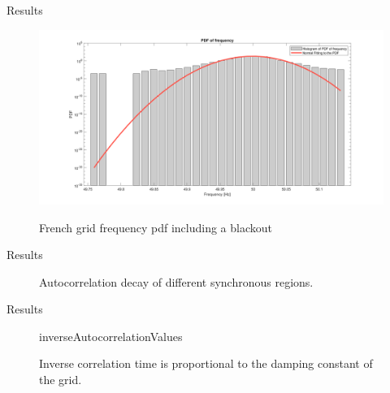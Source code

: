 \begin{frame}{Results}
	\begin{figure}
		\centering
		\includegraphics[scale=0.15]{../figures/pdf/pdf_frequency_rte_2021_01_blackout}
		\label{fig:pdf_rte2021blackout}
		\caption{French grid frequency pdf including a blackout}
	\end{figure}
\end{frame}

\begin{frame}{Results}	
	\begin{figure}[ht]
		\centering
		\caption{Autocorrelation decay of different synchronous regions.}
		\label{fig:comp5}
	\end{figure}
\end{frame}

\begin{frame}{Results}
	\begin{figure}
		\centering
		{inverseAutocorrelationValues}
		\label{tab:invAutocorr}
		\caption{Inverse correlation time is proportional to the damping constant of the grid.}
	\end{figure}	
\end{frame}

